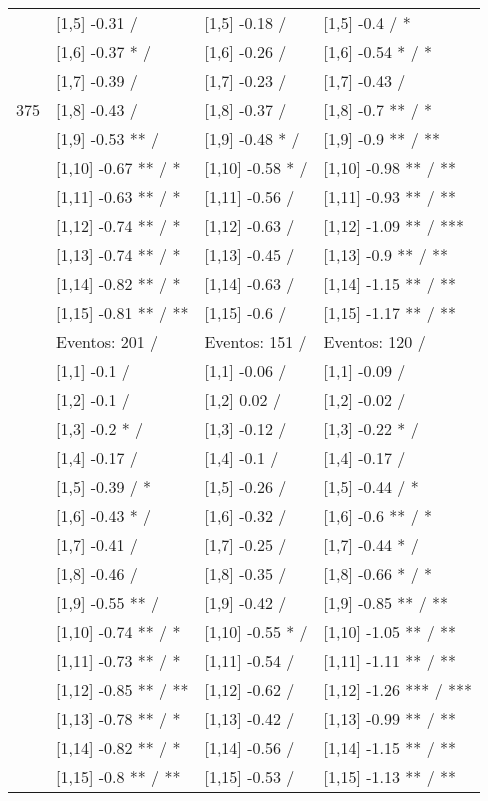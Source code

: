 \begin{table}
\begin{tabular}[t]{llll}
 & {}[1,5] -0.31  / & {}[1,5] -0.18  / & {}[1,5] -0.4  / *\\
 & {}[1,6] -0.37 * / & {}[1,6] -0.26  / & {}[1,6] -0.54 * / *\\
 & {}[1,7] -0.39  / & {}[1,7] -0.23  / & {}[1,7] -0.43  /\\
375 & {}[1,8] -0.43  / & {}[1,8] -0.37  / & {}[1,8] -0.7 ** / *\\
\addlinespace
 & {}[1,9] -0.53 ** / & {}[1,9] -0.48 * / & {}[1,9] -0.9 ** / **\\
 & {}[1,10] -0.67 ** / * & {}[1,10] -0.58 * / & {}[1,10] -0.98 ** / **\\
 & {}[1,11] -0.63 ** / * & {}[1,11] -0.56  / & {}[1,11] -0.93 ** / **\\
 & {}[1,12] -0.74 ** / * & {}[1,12] -0.63  / & {}[1,12] -1.09 ** / ***\\
 & {}[1,13] -0.74 ** / * & {}[1,13] -0.45  / & {}[1,13] -0.9 ** / **\\
\addlinespace
 & {}[1,14] -0.82 ** / * & {}[1,14] -0.63  / & {}[1,14] -1.15 ** / **\\
 & {}[1,15] -0.81 ** / ** & {}[1,15] -0.6  / & {}[1,15] -1.17 ** / **\\
 & Eventos:  201 / & Eventos:  151 / & Eventos:  120 /\\
 & {}[1,1] -0.1  / & {}[1,1] -0.06  / & {}[1,1] -0.09  /\\
 & {}[1,2] -0.1  / & {}[1,2] 0.02  / & {}[1,2] -0.02  /\\
\addlinespace
 & {}[1,3] -0.2 * / & {}[1,3] -0.12  / & {}[1,3] -0.22 * /\\
 & {}[1,4] -0.17  / & {}[1,4] -0.1  / & {}[1,4] -0.17  /\\
 & {}[1,5] -0.39  / * & {}[1,5] -0.26  / & {}[1,5] -0.44  / *\\
 & {}[1,6] -0.43 * / & {}[1,6] -0.32  / & {}[1,6] -0.6 ** / *\\
 & {}[1,7] -0.41  / & {}[1,7] -0.25  / & {}[1,7] -0.44 * /\\
\addlinespace
500 & {}[1,8] -0.46  / & {}[1,8] -0.35  / & {}[1,8] -0.66 * / *\\
 & {}[1,9] -0.55 ** / & {}[1,9] -0.42  / & {}[1,9] -0.85 ** / **\\
 & {}[1,10] -0.74 ** / * & {}[1,10] -0.55 * / & {}[1,10] -1.05 ** / **\\
 & {}[1,11] -0.73 ** / * & {}[1,11] -0.54  / & {}[1,11] -1.11 ** / **\\
 & {}[1,12] -0.85 ** / ** & {}[1,12] -0.62  / & {}[1,12] -1.26 *** / ***\\
\addlinespace
 & {}[1,13] -0.78 ** / * & {}[1,13] -0.42  / & {}[1,13] -0.99 ** / **\\
 & {}[1,14] -0.82 ** / * & {}[1,14] -0.56  / & {}[1,14] -1.15 ** / **\\
 & {}[1,15] -0.8 ** / ** & {}[1,15] -0.53  / & {}[1,15] -1.13 ** / **\\
\bottomrule
\end{tabular}
\end{table}
